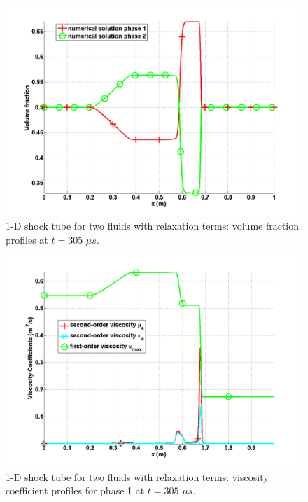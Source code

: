 \begin{figure}[H]
\centering
\includegraphics[width=\textwidth]{figures/SEM/relaxation_two_phases_volume_fraction.png}
\caption{1-D shock tube for two fluids with relaxation terms: volume fraction profiles at $t=305$ $\mu s$.}
\label{fig:two-fluids-rel-vf-7-eqn-sect4}
\end{figure}
%
\begin{figure}[H]
\centering
\includegraphics[width=\textwidth]{figures/SEM/relaxation_two_phases_liquid_viscosity_kappa_mu.png}
\caption{1-D shock tube for two fluids with relaxation terms: viscosity coefficient profiles for phase 1 at $t=305$ $\mu s$.}
\label{fig:two-fluids-rel-visc-2-7-eqn-sect4}
\end{figure}
%
